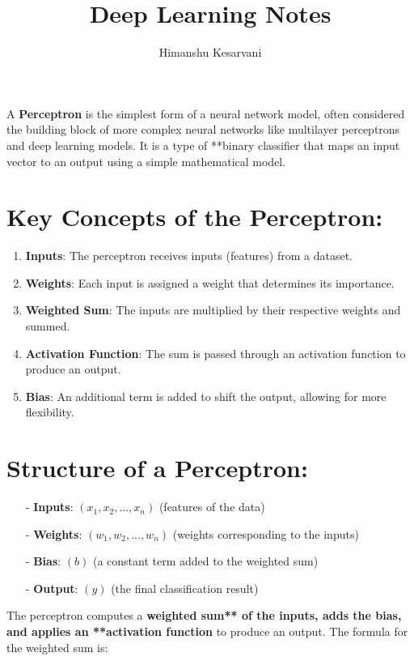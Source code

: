 \documentclass[10pt]{article}
\begin{document}
\title{Deep Learning Notes}
\author{Himanshu Kesarvani}
\maketitle
A {\bf Perceptron} is the simplest form of a neural network model, often considered the building block of more complex neural networks like multilayer perceptrons and deep learning models. It is a type of **binary classifier that maps an input vector to an output using a simple mathematical model.

\section{ Key Concepts of the Perceptron:}

\begin{enumerate}
   \item {\bf Inputs}: The perceptron receives inputs (features) from a dataset.
   \item {\bf Weights}: Each input is assigned a weight that determines its importance.
   \item {\bf Weighted Sum}: The inputs are multiplied by their respective weights and summed.
   \item {\bf Activation Function}: The sum is passed through an activation function to produce an output.
   \item {\bf Bias}: An additional term is added to shift the output, allowing for more flexibility.
\end{enumerate}

\section{ Structure of a Perceptron:}

\begin{enumerate}
   \item [-] {\bf Inputs}: $(x_1, x_2, ..., x_n)$ (features of the data)
   \item [-] {\bf Weights}: $(w_1, w_2, ..., w_n)$ (weights corresponding to the inputs)
   \item [-] {\bf Bias}: $(b)$ (a constant term added to the weighted sum)
   \item [-] {\bf Output}: $(y)$ (the final classification result)
\end{enumerate}

The perceptron computes a {\bf weighted sum** of the inputs, adds the bias, and applies an **activation function} to produce an output. The formula for the weighted sum is:
\end{document}
